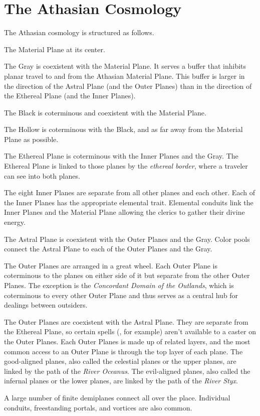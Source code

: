 \section{The Athasian Cosmology}
The Athasian cosmology is structured as follows.

The Material Plane at its center.

The Gray is coexistent with the Material Plane. It serves a buffer that inhibits planar travel to and from the Athasian Material Plane. This buffer is larger in the direction of the Astral Plane (and the Outer Planes) than in the direction of the Ethereal Plane (and the Inner Planes).

The Black is coterminous and coexistent with the Material Plane.

The Hollow is coterminous with the Black, and as far away from the Material Plane as possible.

The Ethereal Plane is coterminous with the Inner Planes and the Gray. The Ethereal Plane is linked to those planes by the \emph{ethereal border}, where a traveler can see into both planes.

The eight Inner Planes are separate from all other planes and each other. Each of the Inner Planes has the appropriate elemental trait. Elemental conduits link the Inner Planes and the Material Plane allowing the clerics to gather their divine energy.

The Astral Plane is coexistent with the Outer Planes and the Gray. Color pools connect the Astral Plane to each of the Outer Planes and the Gray.

The Outer Planes are arranged in a great wheel. Each Outer Plane is coterminous to the planes on either side of it but separate from the other Outer Planes. The exception is the \emph{Concordant Domain of the Outlands}, which is coterminous to every other Outer Plane and thus serves as a central hub for dealings between outsiders.

The Outer Planes are coexistent with the Astral Plane. They are separate from the Ethereal Plane, so certain spells (, for example) aren't available to a caster on the Outer Planes. Each Outer Planes is made up of related layers, and the most common access to an Outer Plane is through the top layer of each plane. The good-aligned planes, also called the celestial planes or the upper planes, are linked by the path of the \emph{River Oceanus}. The evil-aligned planes, also called the infernal planes or the lower planes, are linked by the path of the \emph{River Styx}.

A large number of finite demiplanes connect all over the place. Individual conduits, freestanding portals, and vortices are also common.
